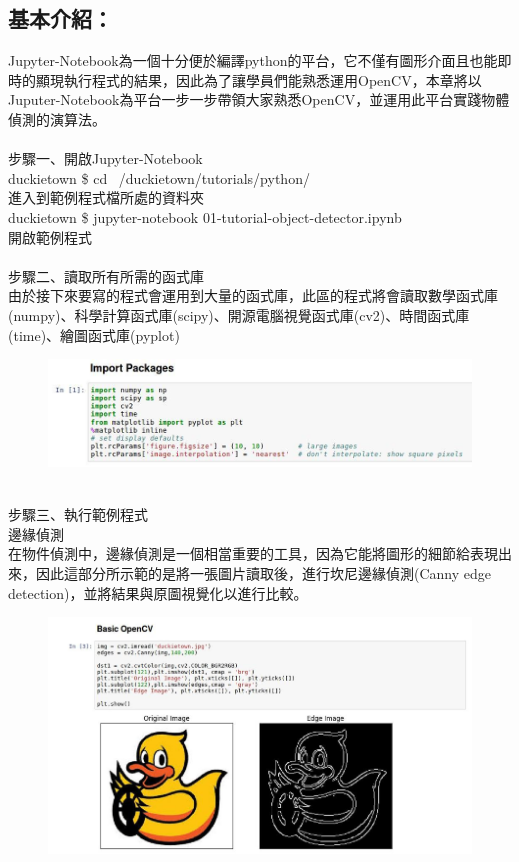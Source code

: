 \documentclass{article}
\begin{document}
\subsection{基本介紹：}
Jupyter-Notebook為一個十分便於編譯python的平台，它不僅有圖形介面且也能即時的顯現執行程式的結果，因此為了讓學員們能熟悉運用OpenCV，本章將以Juputer-Notebook為平台一步一步帶領大家熟悉OpenCV，並運用此平台實踐物體偵測的演算法。
\\\\步驟一、開啟Jupyter-Notebook
\\duckietown \$ cd ~/duckietown/tutorials/python/
\\進入到範例程式檔所處的資料夾
\\duckietown \$ jupyter-notebook 01-tutorial-object-detector.ipynb
\\開啟範例程式
\\\\步驟二、讀取所有所需的函式庫
\\由於接下來要寫的程式會運用到大量的函式庫，此區的程式將會讀取數學函式庫(numpy)、科學計算函式庫(scipy)、開源電腦視覺函式庫(cv2)、時間函式庫(time)、繪圖函式庫(pyplot)
\
\begin{figure}[htp]
    \begin{center}
        \includegraphics[width=400pt]{pic/5_1_1.png}
    \end{center}
\end{figure}
\\
步驟三、執行範例程式
\\邊緣偵測
\\在物件偵測中，邊緣偵測是一個相當重要的工具，因為它能將圖形的細節給表現出來，因此這部分所示範的是將一張圖片讀取後，進行坎尼邊緣偵測(Canny edge detection)，並將結果與原圖視覺化以進行比較。
\
\begin{figure}[htp]
    \begin{center}
        \includegraphics[width=400pt]{pic/5_1_2.png}
    \end{center}
\end{figure}
\end{document}

